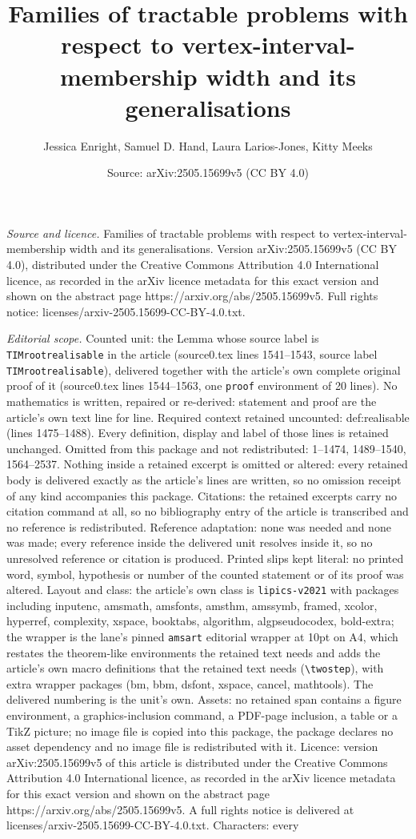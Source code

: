 \documentclass[10pt,a4paper]{amsart}
\title[Families of tractable problems with respect to vertex-interv]{Families of tractable problems with respect to vertex-interval-membership width and its generalisations}
\author{Jessica Enright, Samuel D. Hand, Laura Larios-Jones, Kitty Meeks}
\date{Source: arXiv:2505.15699v5 (CC BY 4.0)}
\begin{document}
\maketitle

\noindent\emph{Source and licence.} Families of tractable problems with respect to vertex-interval-membership width and its generalisations. Version arXiv:2505.15699v5 (CC BY 4.0), distributed under the Creative Commons Attribution 4.0 International licence, as recorded in the arXiv licence metadata for this exact version and shown on the abstract page https://arxiv.org/abs/2505.15699v5. Full rights notice: licenses/arxiv-2505.15699-CC-BY-4.0.txt.\par\smallskip

\noindent\textit{Editorial scope.} Counted unit: the Lemma whose source label is \texttt{TIMrootrealisable} in the article (source0.tex lines 1541--1543, source label \texttt{TIMrootrealisable}), delivered together with the article's own complete original proof of it (source0.tex lines 1544--1563, one \texttt{proof} environment of 20 lines). No mathematics is written, repaired or re-derived: statement and proof are the article's own text line for line. Required context retained uncounted: def:realisable (lines 1475--1488). Every definition, display and label of those lines is retained unchanged. Omitted from this package and not redistributed: 1--1474, 1489--1540, 1564--2537. Nothing inside a retained excerpt is omitted or altered: every retained body is delivered exactly as the article's lines are written, so no omission receipt of any kind accompanies this package. Citations: the retained excerpts carry no citation command at all, so no bibliography entry of the article is transcribed and no reference is redistributed. Reference adaptation: none was needed and none was made; every reference inside the delivered unit resolves inside it, so no unresolved reference or citation is produced. Printed slips kept literal: no printed word, symbol, hypothesis or number of the counted statement or of its proof was altered. Layout and class: the article's own class is \texttt{lipics-v2021} with packages including inputenc, amsmath, amsfonts, amsthm, amssymb, framed, xcolor, hyperref, complexity, xspace, booktabs, algorithm, algpseudocodex, bold-extra; the wrapper is the lane's pinned \texttt{amsart} editorial wrapper at 10pt on A4, which restates the theorem-like environments the retained text needs and adds the article's own macro definitions that the retained text needs (\texttt{\textbackslash twostep}), with extra wrapper packages (bm, bbm, dsfont, xspace, cancel, mathtools). The delivered numbering is the unit's own. Assets: no retained span contains a figure environment, a graphics-inclusion command, a PDF-page inclusion, a table or a TikZ picture; no image file is copied into this package, the package declares no asset dependency and no image file is redistributed with it. Licence: version arXiv:2505.15699v5 of this article is distributed under the Creative Commons Attribution 4.0 International licence, as recorded in the arXiv licence metadata for this exact version and shown on the abstract page https://arxiv.org/abs/2505.15699v5. A full rights notice is delivered at licenses/arxiv-2505.15699-CC-BY-4.0.txt. Characters: every 
\end{document}
